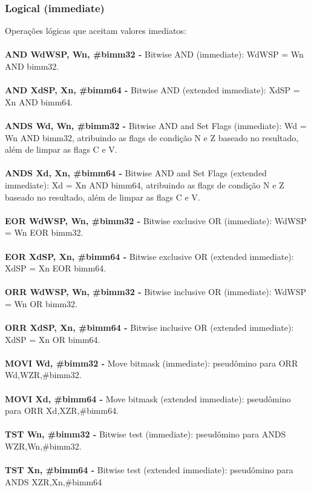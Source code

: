 \documentclass[12pt,a4paper,utf8]{ppgsi}
\begin{document}
\subsubsection{Logical (immediate)}
Operações lógicas que aceitam valores imediatos:
\\\\\textbf{AND Wd\textbar WSP, Wn, \#bimm32 -} Bitwise AND (immediate): Wd\textbar WSP = Wn AND bimm32.
\\\\\textbf{AND Xd\textbar SP, Xn, \#bimm64 -} Bitwise AND (extended immediate): Xd\textbar SP = Xn AND bimm64.
\\\\\textbf{ANDS Wd, Wn, \#bimm32 -} Bitwise AND and Set Flags (immediate): Wd = Wn AND bimm32, atribuindo as flags de condição N e Z baseado no resultado, além de limpar as flags C e V.
\\\\\textbf{ANDS Xd, Xn, \#bimm64 -} Bitwise AND and Set Flags (extended immediate): Xd = Xn AND bimm64, atribuindo as flags de condição N e Z baseado no resultado, além de limpar as flags C e V.
\\\\\textbf{EOR Wd\textbar WSP, Wn, \#bimm32 -} Bitwise exclusive OR (immediate): Wd\textbar WSP = Wn EOR bimm32.
\\\\\textbf{EOR Xd\textbar SP, Xn, \#bimm64 -} Bitwise exclusive OR (extended immediate): Xd\textbar SP = Xn EOR bimm64.
\\\\\textbf{ORR Wd\textbar WSP, Wn, \#bimm32 -} Bitwise inclusive OR (immediate): Wd\textbar WSP = Wn OR bimm32.
\\\\\textbf{ORR Xd\textbar SP, Xn, \#bimm64 -} Bitwise inclusive OR (extended immediate): Xd\textbar SP = Xn OR bimm64.
\\\\\textbf{MOVI Wd, \#bimm32 -} Move bitmask (immediate): pseudômino para ORR Wd,WZR,\#bimm32.
\\\\\textbf{MOVI Xd, \#bimm64 -} Move bitmask (extended immediate): pseudômino para ORR Xd,XZR,\#bimm64.
\\\\\textbf{TST Wn, \#bimm32 -} Bitwise test (immediate): pseudômino para ANDS WZR,Wn,\#bimm32.
\\\\\textbf{TST Xn, \#bimm64 -} Bitwise test (extended immediate): pseudômino para ANDS XZR,Xn,\#bimm64
\end{document}
